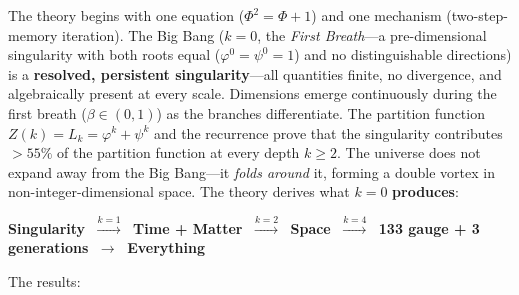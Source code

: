 \documentclass[12pt,a4paper]{article}
\begin{document}
The theory begins with one equation ($\Phi^2 = \Phi + 1$) and one mechanism (two-step-memory iteration). The Big Bang ($k = 0$, the \emph{First Breath}---a pre-dimensional singularity with both roots equal ($\varphi^0 = \psi^0 = 1$) and no distinguishable directions) is a \textbf{resolved, persistent singularity}---all quantities finite, no divergence, and algebraically present at every scale. Dimensions emerge continuously during the first breath ($\beta \in (0,1)$) as the branches differentiate. The partition function $Z(k) = L_k = \varphi^k + \psi^k$ and the recurrence prove that the singularity contributes $>55\%$ of the partition function at every depth $k \geq 2$. The universe does not expand away from the Big Bang---it \emph{folds around} it, forming a double vortex in non-integer-dimensional space. The theory derives what $k = 0$ \textbf{produces}:

\begin{center}
\textbf{Singularity} $\;\xrightarrow{k=1}\;$ \textbf{Time + Matter} $\;\xrightarrow{k=2}\;$ \textbf{Space} $\;\xrightarrow{k=4}\;$ \textbf{133 gauge + 3 generations} $\;\to\;$ \textbf{Everything}
\end{center}

\noindent The results:
\end{document}
